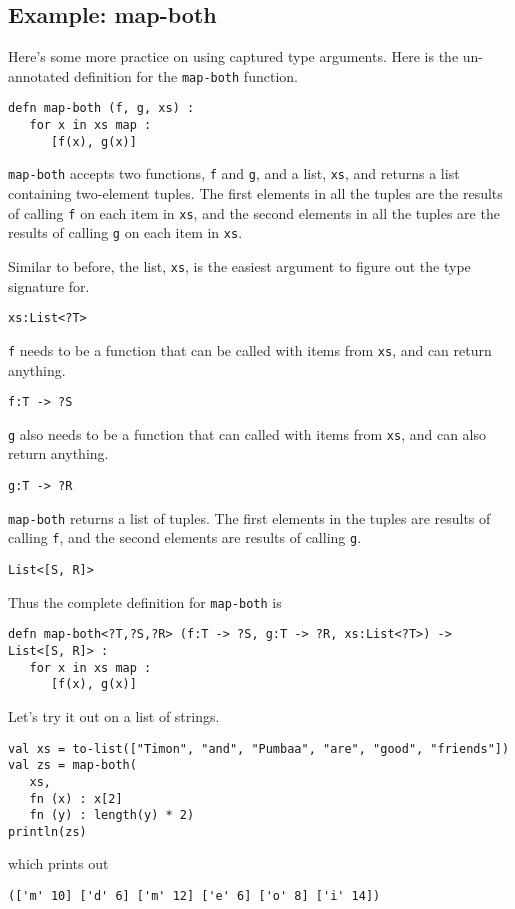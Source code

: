 \documentclass[10pt,oneside]{book}
\begin{document}
\subsection*{Example: map-both}
Here's some more practice on using captured type arguments. Here is the un-annotated definition for the \texttt{\frenchspacing map-both} function.
\begin{lstlisting}
defn map-both (f, g, xs) :
   for x in xs map :
      [f(x), g(x)]
\end{lstlisting}
\texttt{\frenchspacing map-both} accepts two functions, \texttt{\frenchspacing f} and \texttt{\frenchspacing g}, and a list, \texttt{\frenchspacing xs}, and returns a list containing two-element tuples. The first elements in all the tuples are the results of calling \texttt{\frenchspacing f} on each item in \texttt{\frenchspacing xs}, and the second elements in all the tuples are the results of calling \texttt{\frenchspacing g} on each item in \texttt{\frenchspacing xs}.

Similar to before, the list, \texttt{\frenchspacing xs}, is the easiest argument to figure out the type signature for.
\begin{lstlisting}
xs:List<?T>
\end{lstlisting}
\texttt{\frenchspacing f} needs to be a function that can be called with items from \texttt{\frenchspacing xs}, and can return anything.
\begin{lstlisting}
f:T -> ?S
\end{lstlisting}
\texttt{\frenchspacing g} also needs to be a function that can called with items from \texttt{\frenchspacing xs}, and can also return anything. 
\begin{lstlisting}
g:T -> ?R
\end{lstlisting}
\texttt{\frenchspacing map-both} returns a list of tuples. The first elements in the tuples are results of calling \texttt{\frenchspacing f}, and the second elements are results of calling \texttt{\frenchspacing g}.
\begin{lstlisting}
List<[S, R]>
\end{lstlisting}

Thus the complete definition for \texttt{\frenchspacing map-both} is
\begin{lstlisting}
defn map-both<?T,?S,?R> (f:T -> ?S, g:T -> ?R, xs:List<?T>) -> List<[S, R]> :
   for x in xs map :
      [f(x), g(x)]
\end{lstlisting}

Let's try it out on a list of strings.
\begin{lstlisting}
val xs = to-list(["Timon", "and", "Pumbaa", "are", "good", "friends"])
val zs = map-both(
   xs,
   fn (x) : x[2]
   fn (y) : length(y) * 2)
println(zs)
\end{lstlisting}
which prints out
\begin{lstlisting}
(['m' 10] ['d' 6] ['m' 12] ['e' 6] ['o' 8] ['i' 14])
\end{lstlisting}
\end{document}
